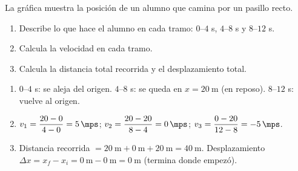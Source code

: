\begin{exercise}
    La gráfica muestra la posición de un alumno que camina por un pasillo recto.
    \begin{center}
    \end{center}
    \begin{enumerate}[label=\letraminuscula]
        \item Describe lo que hace el alumno en cada tramo: \(0\)--\(4\) s, \(4\)--\(8\) s y \(8\)--\(12\) s.
        \item Calcula la velocidad en cada tramo.
        \item Calcula la distancia total recorrida y el desplazamiento total.
    \end{enumerate}
    \begin{solu}
        \begin{enumerate}[label=\alph*)]
            \item \(0\)--\(4\) s: se aleja del origen. \(4\)--\(8\) s: se queda en \(x = \qty{20}{\m}\) (en reposo). \(8\)--\(12\) s: vuelve al origen.
            \item \(v_1 = \dfrac{20 - 0}{4 - 0} = \qty{5}{\mps}\); \quad \(v_2 = \dfrac{20 - 20}{8 - 4} = \qty{0}{\mps}\); \quad \(v_3 = \dfrac{0 - 20}{12 - 8} = \qty{-5}{\mps}\).
            \item Distancia recorrida \(= \qty{20}{\m} + \qty{0}{\m} + \qty{20}{\m} = \qty{40}{\m}\). Desplazamiento \(\Delta x = x_f - x_i = \qty{0}{\m} - \qty{0}{\m} = \qty{0}{\m}\) (termina donde empezó).
        \end{enumerate}
    \end{solu}
\end{exercise}


